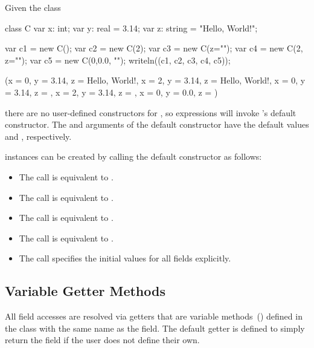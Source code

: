 \begin{example}
Given the class
\begin{chapelpre}
\end{chapelpre}
\begin{chapel}
class C {
  var x: int;
  var y: real = 3.14;
  var z: string = "Hello, World!";
}
\end{chapel}
\begin{chapelpost}
var c1 = new C();
var c2 = new C(2);
var c3 = new C(z="");
var c4 = new C(2, z="");
var c5 = new C(0,0.0, "");
writeln((c1, c2, c3, c4, c5));
\end{chapelpost}
\begin{chapeloutput}
({x = 0, y = 3.14, z = Hello, World!}, {x = 2, y = 3.14, z = Hello, World!}, {x = 0, y = 3.14, z = }, {x = 2, y = 3.14, z = }, {x = 0, y = 0.0, z = })
\end{chapeloutput}
there are no user-defined constructors for , so  expressions
will invoke 's default constructor. The  and  arguments
of the default constructor have the default values  and
, respectively.

 instances can be created by calling the default constructor as follows:
\begin{itemize}
\item The call  is equivalent to .
\item The call  is equivalent to .
\item The call  is equivalent to .
\item The call  is equivalent to .
\item The call  specifies the initial values for all fields explicitly.
\end{itemize}
\end{example}

\subsection{Variable Getter Methods}
\label{Getter_Methods}

All field accesses are resolved via getters that are variable
methods~() defined in the class with the same
name as the field.  The default getter is defined to simply return the
field if the user does not define their own.

